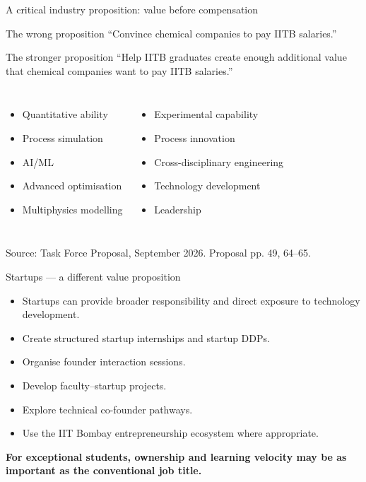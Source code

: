 \documentclass[aspectratio=169,11pt]{beamer}
\newcommand{\key}[1]{\textbf{\color{IITblue}#1}}
\newcommand{\sourcefoot}[1]{\vfill\tiny\color{gray}Source: Task Force Proposal, September 2026. #1}
\begin{document}
\begin{frame}{A critical industry proposition: value before compensation}
\begin{block}{The wrong proposition}
``Convince chemical companies to pay IITB salaries.''
\end{block}
\begin{block}{The stronger proposition}
``Help IITB graduates create enough additional value that chemical companies want to pay IITB salaries.''
\end{block}
\vspace{4mm}
\begin{columns}[T]
\begin{itemize}
\item Quantitative ability
\item Process simulation
\item AI/ML
\item Advanced optimisation
\item Multiphysics modelling
\end{itemize}
\begin{itemize}
\item Experimental capability
\item Process innovation
\item Cross-disciplinary engineering
\item Technology development
\item Leadership
\end{itemize}
\end{columns}
\sourcefoot{Proposal pp. 49, 64--65.}
\end{frame}

\begin{frame}{Startups — a different value proposition}
\begin{itemize}
\item Startups can provide broader responsibility and direct exposure to technology development.
\item Create structured startup internships and startup DDPs.
\item Organise founder interaction sessions.
\item Develop faculty--startup projects.
\item Explore technical co-founder pathways.
\item Use the IIT Bombay entrepreneurship ecosystem where appropriate.
\end{itemize}
\vspace{5mm}
\centering\Large\key{For exceptional students, ownership and learning velocity may be as important as the conventional job title.}
\end{frame}
\end{document}
